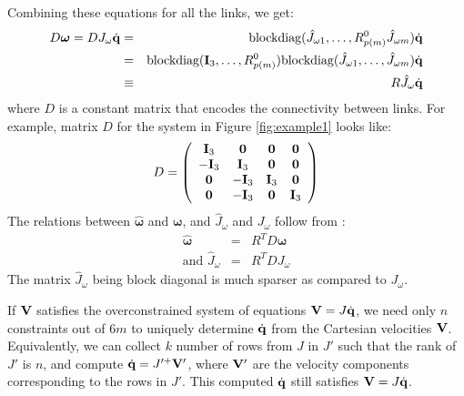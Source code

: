 Combining these equations for all the links, we get:
\begin{eqnarray}
\label{eq:jacsplit}
\nonumber
D \bm{\omega} = D J_{\omega} \dot{\mathbf{q}} & = & \mbox{blockdiag}(\hat{J}_{\omega 1},\hdots,R^0_{p(m)}\hat{J}_{\omega m})\dot{\mathbf{q}}\\
\nonumber
& = & \mbox{blockdiag}(\mathbf{I}_3,\hdots,R^0_{p(m)})\mbox{blockdiag}(\hat{J}_{\omega 1},\hdots,\hat{J}_{\omega m})\dot{\mathbf{q}}\\
& \equiv & R \hat{J}_{\omega}\dot{\mathbf{q}}
\end{eqnarray}
where $D$ is a constant matrix that encodes the connectivity between links. For example, matrix $D$ for the system in Figure \ref{fig:example1} looks
like:
\begin{equation}
D =
\left (
\begin{array}{cccc}
\mathbf{I}_{3}  & \mathbf{0} & \mathbf{0} & \mathbf{0}\\
-\mathbf{I}_{3} & \mathbf{I}_{3}  & \mathbf{0} & \mathbf{0}\\
\mathbf{0} & -\mathbf{I}_{3} & \mathbf{I}_{3}  & \mathbf{0}\\
\mathbf{0} & -\mathbf{I}_{3} & \mathbf{0} & \mathbf{I}_{3}\\
\end{array}
\right )  
\end{equation}
The relations between $\hat{\bm{\omega}}$ and $\bm{\omega}$, and $\hat{J}_{\omega}$ and $J_{\omega}$ follow from :
\begin{eqnarray}
\label{eq:jacbodyhat}
\nonumber
\hat{\bm{\omega}} & = &R^T D \bm{\omega}\\
\mbox{and } \hat{J}_{\omega} & = & R^T D J_{\omega}
\end{eqnarray}
The matrix $\hat{J}_{\omega}$ being block diagonal is much sparser as compared to ${J}_{\omega}$. 

{
If $\mathbf{V}$ satisfies the overconstrained system of equations $\mathbf{V} = J\dot{\mathbf{q}}$, we need only $n$ constraints out of $6m$ to uniquely determine $\dot{\mathbf{q}}$ from the Cartesian velocities $\mathbf{V}$. Equivalently, we can collect $k$ number of rows from $J$ in $J'$ such that the rank of $J'$ is $n$, and compute $\dot{\mathbf{q}} = J'^+ \mathbf{V}'$, where $\mathbf{V}'$ are the velocity components corresponding to the rows in $J'$. This computed $\dot{\mathbf{q}}$ still satisfies $\mathbf{V} = J\dot{\mathbf{q}}$. 
}

